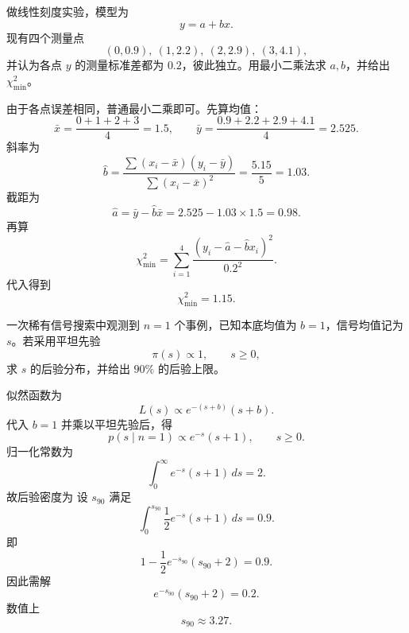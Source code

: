 \begin{question}
做线性刻度实验，模型为
\[
y=a+bx.
\]
现有四个测量点
\[
(0,0.9),\ (1,2.2),\ (2,2.9),\ (3,4.1),
\]
并认为各点 $y$ 的测量标准差都为 $0.2$，彼此独立。用最小二乘法求 $a,b$，并给出 $\chi^2_{\min}$。
\begin{solution}
由于各点误差相同，普通最小二乘即可。先算均值：
\[
\bar x=\frac{0+1+2+3}{4}=1.5,
\qquad
\bar y=\frac{0.9+2.2+2.9+4.1}{4}=2.525.
\]
斜率为
\[
\hat b=\frac{\sum (x_i-\bar x)(y_i-\bar y)}{\sum (x_i-\bar x)^2}
=\frac{5.15}{5}=1.03.
\]
截距为
\[
\hat a=\bar y-\hat b\bar x=2.525-1.03\times1.5=0.98.
\]
再算
\[
\chi^2_{\min}=\sum_{i=1}^4\frac{(y_i-\hat a-\hat b x_i)^2}{0.2^2}.
\]
代入得到
\[
\chi^2_{\min}=1.15.
\]
\end{solution}
\end{question}

\begin{question}
一次稀有信号搜索中观测到 $n=1$ 个事例，已知本底均值为 $b=1$，信号均值记为 $s$。若采用平坦先验
\[
\pi(s)\propto 1,
\qquad s\ge 0,
\]
求 $s$ 的后验分布，并给出 $90\%$ 的后验上限。
\begin{solution}
似然函数为
\[
L(s)\propto e^{-(s+b)}(s+b).
\]
代入 $b=1$ 并乘以平坦先验后，得
\[
p(s\mid n=1)\propto e^{-s}(s+1),
\qquad s\ge 0.
\]
归一化常数为
\[
\int_0^{\infty} e^{-s}(s+1)\,ds=2.
\]
故后验密度为
设 $s_{90}$ 满足
\[
\int_0^{s_{90}}\frac12 e^{-s}(s+1)\,ds=0.9.
\]
即
\[
1-\frac12 e^{-s_{90}}(s_{90}+2)=0.9.
\]
因此需解
\[
e^{-s_{90}}(s_{90}+2)=0.2.
\]
数值上
\[
s_{90}\approx 3.27.
\]
\end{solution}
\end{question}

